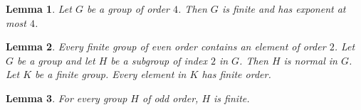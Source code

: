 \documentclass{article}
\newtheorem{lemma}{Lemma}
\begin{document}
\begin{lemma}\label{finite-and-order}
Let $G$ be a group of order $4$. Then $G$ is finite and has exponent at most $4$.
\end{lemma}

\begin{lemma}\label{contains-in}
Every finite group of even order contains an element of order $2$. Let $G$ be a group and let $H$ be a subgroup of index $2$ in $G$. Then $H$ is normal in $G$. Let $K$ be a finite group. Every element in $K$ has finite order.
\end{lemma}

\begin{lemma}\label{binder-order}
For every group $H$ of odd order, $H$ is finite.
\end{lemma}
\end{document}
